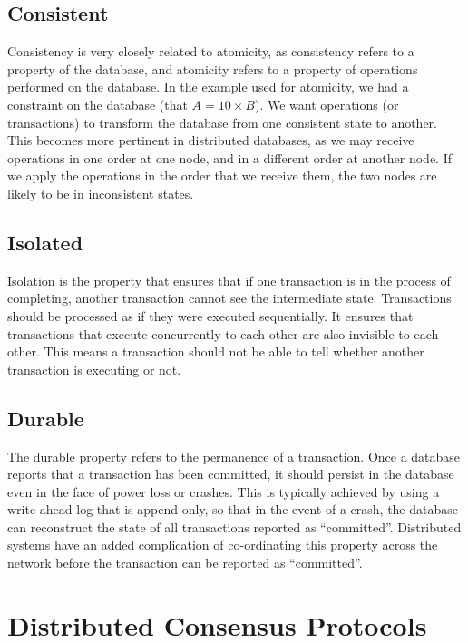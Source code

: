 \documentclass[12pt,twoside,notitlepage]{report}
\begin{document}
\subsection*{Consistent}

Consistency is very closely related to atomicity, as consistency refers to a property of the
database, and atomicity refers to a property of operations performed on the database. In the
example used for atomicity, we had a constraint on the database (that $A = 10\times B$). We want
operations (or transactions) to transform the database from one consistent state to another. This
becomes more pertinent in distributed databases, as we may receive operations in one order at one
node, and in a different order at another node. If we apply the operations in the order that we
receive them, the two nodes are likely to be in inconsistent states.

\subsection*{Isolated}

Isolation is the property that ensures that if one transaction is in the process of completing,
another transaction cannot see the intermediate state. Transactions should be processed as if they
were executed sequentially. It ensures that transactions that execute concurrently to each other
are also invisible to each other. This means a transaction should not be able to tell whether
another transaction is executing or not.

\subsection*{Durable}

The durable property refers to the permanence of a transaction. Once a database reports that a
transaction has been committed, it should persist in the database even in the face of power loss or
crashes. This is typically achieved by using a write-ahead log that is append only, so that in the
event of a crash, the database can reconstruct the state of all transactions reported as
``committed''. Distributed systems have an added complication of co-ordinating this property
across the network before the transaction can be reported as ``committed''.

\section{Distributed Consensus Protocols}
\end{document}
